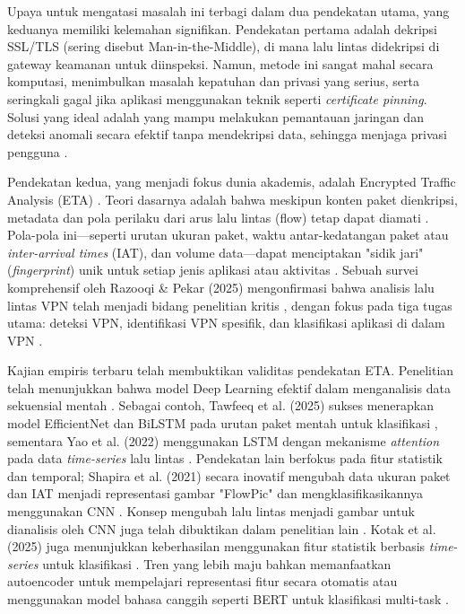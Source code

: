 Upaya untuk mengatasi masalah ini terbagi dalam dua pendekatan utama, yang keduanya memiliki kelemahan signifikan. Pendekatan pertama adalah dekripsi SSL/TLS (sering disebut Man-in-the-Middle), di mana lalu lintas didekripsi di gateway keamanan untuk diinspeksi. Namun, metode ini sangat mahal secara komputasi, menimbulkan masalah kepatuhan dan privasi yang serius, serta seringkali gagal jika aplikasi menggunakan teknik seperti \textit{certificate pinning}. Solusi yang ideal adalah yang mampu melakukan pemantauan jaringan dan deteksi anomali secara efektif tanpa mendekripsi data, sehingga menjaga privasi pengguna \citep{lopez2017network}.

Pendekatan kedua, yang menjadi fokus dunia akademis, adalah Encrypted Traffic Analysis (ETA) \citep{wright2004hmm}. Teori dasarnya adalah bahwa meskipun konten paket dienkripsi, metadata dan pola perilaku dari arus lalu lintas (flow) tetap dapat diamati \citep{tawfeeq2025adversarial}. Pola-pola ini—seperti urutan ukuran paket, waktu antar-kedatangan paket atau \textit{inter-arrival times} (IAT), dan volume data—dapat menciptakan "sidik jari" (\textit{fingerprint}) unik untuk setiap jenis aplikasi atau aktivitas \citep{8845643}. Sebuah survei komprehensif oleh Razooqi \& Pekar (2025) mengonfirmasi bahwa analisis lalu lintas VPN telah menjadi bidang penelitian kritis \citep{Razooqi2025-bo, shahbar2015traffic}, dengan fokus pada tiga tugas utama: deteksi VPN, identifikasi VPN spesifik, dan klasifikasi aplikasi di dalam VPN \citep{Razooqi2025-bo}.

Kajian empiris terbaru telah membuktikan validitas pendekatan ETA. Penelitian telah menunjukkan bahwa model Deep Learning efektif dalam menganalisis data sekuensial mentah \citep{rezaei2018deep}. Sebagai contoh, Tawfeeq et al. (2025) sukses menerapkan model EfficientNet dan BiLSTM pada urutan paket mentah  untuk klasifikasi \citep{tawfeeq2025adversarial}, sementara Yao et al. (2022) menggunakan LSTM dengan mekanisme \textit{attention} pada data \textit{time-series} lalu lintas \citep{8845643}. Pendekatan lain berfokus pada fitur statistik dan temporal; Shapira et al. (2021) secara inovatif mengubah data ukuran paket dan IAT menjadi representasi gambar "FlowPic" dan mengklasifikasikannya menggunakan CNN \citep{shapira2021flowpic}. Konsep mengubah lalu lintas menjadi gambar untuk dianalisis oleh CNN juga telah dibuktikan dalam penelitian lain \citep{he2020image}. Kotak et al. (2025) juga menunjukkan keberhasilan menggunakan fitur statistik berbasis \textit{time-series} untuk klasifikasi \citep{kotak2025vpn}. Tren yang lebih maju bahkan memanfaatkan autoencoder untuk mempelajari representasi fitur secara otomatis \citep{cui2024attention, lv2023aae} atau menggunakan model bahasa canggih seperti BERT untuk klasifikasi multi-task \citep{park2024fast, lin2022bert}.

